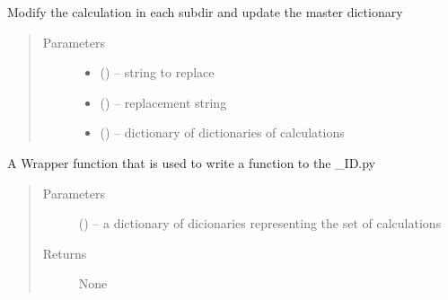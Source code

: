 \documentclass[letterpaper,10pt,english]{sphinxmanual}
\begin{document}
\begin{fulllineitems}
\label{\detokenize{prep:prep.modifyCalcs}}
Modify the calculation in each subdir and update the master dictionary
\begin{quote}\begin{description}
\item[{Parameters}] \leavevmode\begin{itemize}
\item {} 
 () -- string to replace

\item {} 
 () -- replacement string

\item {} 
 () -- dictionary of dictionaries of calculations

\end{itemize}

\end{description}\end{quote}

\end{fulllineitems}


\begin{fulllineitems}
\label{\detokenize{prep:prep.modifyInputPrefixPW}}
A Wrapper function that is used to write a function to the \_ID.py
\begin{quote}\begin{description}
\item[{Parameters}] \leavevmode
{} () -- a dictionary of dicionaries representing the set of calculations

\item[{Returns}] \leavevmode
None

\end{description}\end{quote}

\end{fulllineitems}

\end{document}
